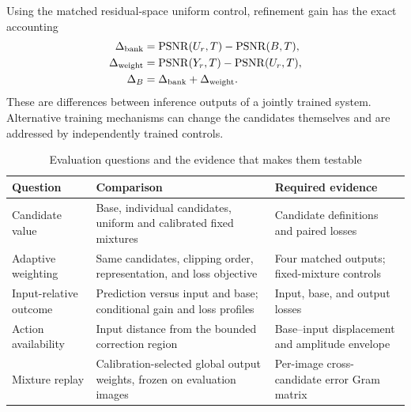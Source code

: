 \documentclass[12pt]{article}
\newcommand{\PSNR}{\operatorname{PSNR}}
\begin{document}
Using the matched residual-space uniform control, refinement gain has the exact accounting
\begin{align}
\Delta_{\rm bank} &= \PSNR(U_r,T)-\PSNR(B,T),\\
\Delta_{\rm weight} &= \PSNR(Y_r,T)-\PSNR(U_r,T),\\
\Delta_B &= \Delta_{\rm bank}+\Delta_{\rm weight}. \label{eq:accounting}
\end{align}
These are differences between inference outputs of a jointly trained system. Alternative training mechanisms can change the candidates themselves and are addressed by independently trained controls.

\begin{table}[t]
\caption{Evaluation questions and the evidence that makes them testable}
\label{tab:questions}
\begin{tabularx}{\linewidth}{@{}L{.22\linewidth}XX@{}}
\toprule
Question & Comparison & Required evidence\\
\midrule
Candidate value & Base, individual candidates, uniform and calibrated fixed mixtures & Candidate definitions and paired losses\\
Adaptive weighting & Same candidates, clipping order, representation, and loss objective & Four matched outputs; fixed-mixture controls\\
Input-relative outcome & Prediction versus input and base; conditional gain and loss profiles & Input, base, and output losses\\
Action availability & Input distance from the bounded correction region & Base--input displacement and amplitude envelope\\
Mixture replay & Calibration-selected global output weights, frozen on evaluation images & Per-image cross-candidate error Gram matrix\\
\bottomrule
\end{tabularx}
\end{table}
\end{document}
